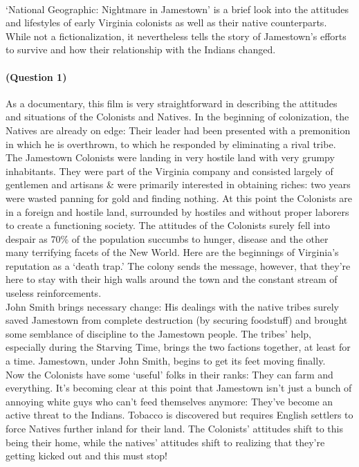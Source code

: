\documentclass[13pt]{article}
\begin{document}

\pagebreak

\paragraph{} `National Geographic: Nightmare in Jamestown' is a brief look into the attitudes and lifestyles of early Virginia colonists as well as their native counterparts. While not a fictionalization, it nevertheless tells the story of Jamestown's efforts to survive and how their relationship with the Indians changed.

\paragraph{(Question 1)} As a documentary, this film is very straightforward in describing the attitudes and situations of the Colonists and Natives. In the beginning of colonization, the Natives are already on edge: Their leader had been presented with a premonition in which he is overthrown, to which he responded by eliminating a rival tribe. The Jamestown Colonists were landing in very hostile land with very grumpy inhabitants. They were part of the Virginia company and consisted largely of gentlemen and artisans \& were primarily interested in obtaining riches: two years were wasted panning for gold and finding nothing. At this point the Colonists are in a foreign and hostile land, surrounded by hostiles and without proper laborers to create a functioning society. The attitudes of the Colonists surely fell into despair as 70\% of the population succumbs to hunger, disease and the other many terrifying facets of the New World. Here are the beginnings of Virginia's reputation as a `death trap.' The colony sends the message, however, that they're here to stay with their high walls around the town and the constant stream of useless reinforcements. \\
John Smith brings necessary change: His dealings with the native tribes surely saved Jamestown from complete destruction (by securing foodstuff) and brought some semblance of discipline to the Jamestown people. The tribes' help, especially during the Starving Time, brings the two factions together, at least for a time. Jamestown, under John Smith, begins to get its feet moving finally. \\
Now the Colonists have some `useful' folks in their ranks: They can farm and everything. It's becoming clear at this point that Jamestown isn't just a bunch of annoying white guys who can't feed themselves anymore: They've become an active threat to the Indians. Tobacco is discovered but requires English settlers to force Natives further inland for their land. The Colonists' attitudes shift to this being their home, while the natives' attitudes shift to realizing that they're getting kicked out and this must stop!
\end{document}
